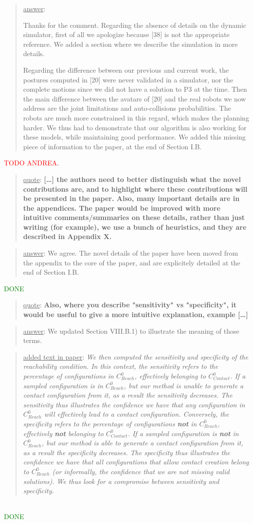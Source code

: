\documentclass[a4paper]{article}
\newcommand{\gls}[1]{\textit{#1}}
\newcommand{\done}[0]{\textcolor{green}{DONE}}
\newcommand\quot[1]{\begin{quote} \underline{quote}: \textbf{#1}\end{quote}}
\newcommand\as[1]{\begin{quote} \underline{answer}: {#1}\end{quote} }
\newcommand\qt[1]{\begin{quote} \underline{added text in paper}: \textit{#1}\end{quote} \leavevmode \\ }
\begin{document}
\as{Thanks for the comment. Regarding the absence of details on the dynamic simulator, first of all we apologize because [38] is not the appropriate reference.
We added a section where we describe the simulation in more details. 

Regarding the difference between our previous and current work, the postures computed in [20] were never validated in a simulator, nor the complete motions since 
we did not have a solution to P3 at the time. Then the main
difference between the avatars of [20] and the real robots we now address are the joint limitations and auto-collisions probabilities.
The robots are much more constrained in this regard, which makes the planning harder. We thus had to demonstrate that our algorithm is also working
for these models, while maintaining good performance.
We added this missing piece of information to the paper, at the end of Section I.B.}
\textcolor{red}{TODO ANDREA}.


\quot{[\dots] the authors need to better
distinguish what the novel contributions are, and to highlight where
these contributions will be presented in the paper.  Also, many
important details are in the appendices. The paper would be improved
with more intuitive comments/summaries on these details, rather than
just writing (for example), we use a bunch of heuristics, and they are
described in Appendix X.}

\as{We agree. The novel details of the paper have been moved from the appendix to the core of the paper, and are explicitely detailed at the end of Section I.B.} \done

\quot{
Also, where you describe "sensitivity" vs "specificity", it would be
useful to give a more intuitive explanation, example [\dots]}

\as{We updated Section VIII.B.1) to illustrate the meaning of those terms.}
\qt{We then computed the sensitivity and specificity of the reachability condition.  In this context, the sensitivity refers to the percentage of configurations in $C_{Reach}^0$, effectively belonging to \gls{$C_{Contact}^0$}. If a sampled configuration is in $C_{Reach}^0$, but our method is unable to generate a contact configuration from it, as a result the sensitivity
decreases. The sensitivity thus illustrates the confidence we have that any configuration in $C_{Reach}^0$ will effectively lead to a contact configuration.
Conversely, the specificity refers to the percentage of configurations \textbf{not} in $C_{Reach}^0$, effectively \textbf{not} belonging to \gls{$C_{Contact}^0$}.
If a sampled configuration is \textbf{not} in $C_{Reach}^0$, but our method is able to generate a contact configuration from it, as a result the specificity
decreases. The specificity thus illustrates the confidence we have that all configurations that allow contact creation belong to $C_{Reach}^0$ (or informally, the confidence that we are not missing valid solutions).
We thus look for a compromise between sensitivity and specificity.} \done
\end{document}
